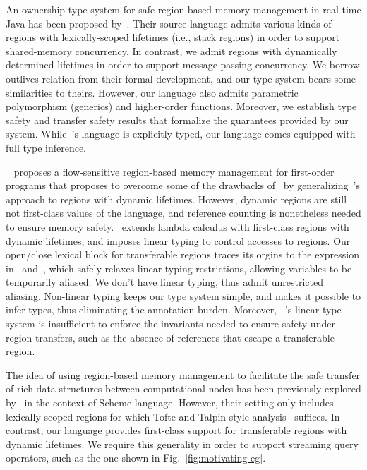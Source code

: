 An ownership type system for safe region-based memory management in
real-time Java has been proposed by~\cite{MIT03}.  
Their source language admits various kinds of regions with
lexically-scoped lifetimes (i.e., stack regions) in order to support
shared-memory concurrency. In contrast, we admit regions with
dynamically determined lifetimes in order to support message-passing
concurrency. We borrow outlives relation from their formal
development, and our type system bears some similarities to theirs.
However, our language also admits parametric polymorphism (generics)
and higher-order functions.
Moreover, we establish type safety and transfer safety results that
formalize the guarantees provided by our system. While~\cite{MIT03}'s
language is explicitly typed, our language comes equipped with full
type inference.

~\cite{HMN01} proposes a flow-sensitive region-based memory management
for first-order programs that proposes to overcome some of the
drawbacks of~\cite{tofte97} by generalizing~\cite{tofte97}'s approach
to regions with dynamic lifetimes. However, dynamic regions are still
not first-class values of the language, and reference counting is
nonetheless needed to ensure memory safety.~\cite{WW01} extends lambda
calculus with first-class regions with dynamic lifetimes, and imposes
linear typing to control accesses to regions. Our open/close lexical
block for transferable regions traces its orgins to the 
expression in~\cite{WW01} and~\cite{wadler90}, which safely relaxes
linear typing restrictions, allowing variables to be temporarily
aliased. We don't have linear typing, thus admit unrestricted
aliasing. Non-linear typing keeps our type system simple, and makes it
possible to infer types, thus eliminating the annotation burden.
Moreover, ~\cite{WW01}'s linear type system is insufficient to enforce
the invariants needed to ensure safety under region transfers, such as
the absence of references that escape a transferable region.

The idea of using region-based memory management to facilitate the
safe transfer of rich data structures between computational nodes has
been previously explored by~\cite{gpu14} in the context of Scheme
language. However, their setting only includes lexically-scoped
regions for which Tofte and Talpin-style analysis~\cite{tofte97}
suffices. In contrast, our language provides first-class support for
transferable regions with dynamic lifetimes. We require this
generality in order to support streaming query operators, such as the
one shown in Fig.~\ref{fig:motivating-eg}. 

